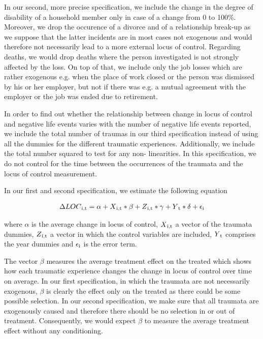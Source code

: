 \documentclass[12pt, a4paper, fleqn, parskip]{scrartcl}
\begin{document}
In our second, more precise specification, we include the change in the degree
of disability of a household member only in case of a change from 0 to 100\%.
Moreover, we drop the occurence of a divorce and of a relationship break-up as
we suppose that the latter incidents are in most cases not exogenous and would
therefore not necessarily lead to a more external locus of control. Regarding
deaths, we would drop deaths where the person investigated is not strongly
affected by the loss. On top of that, we include only the job losses which are
rather exogenous e.g. when the place of work closed or the person was dismissed
by his or her employer, but not if there was e.g. a mutual agreement with the
employer or the job was ended due to retirement.

In order to find out whether the relationship between change in locus of
control and negative life events varies with the number of negative life events
reported, we include the total number of traumas in our third specification
instead of using all the dummies for the different traumatic experiences.
Additionally, we include the total number squared to test for any non-
linearities. In this specification, we do not control for the time between the
occurrences of the traumata and the locus of control measurement.

In our first and second specification, we estimate the following equation

\begin{align}
	\Delta LOC \textsubscript{i,t}= \alpha + X \textsubscript{i,t} * \beta + Z
	\textsubscript{i,t} * \gamma + Y\textsubscript{t} * \delta +
	\epsilon\textsubscript{i}
\end{align}

where $\alpha$ is the average change in locus of control, $
X\textsubscript{i,t}$ a vector of the traumata dummies, $ Z\textsubscript{i,t}$
a vector in which the control variables are included, $ Y\textsubscript{t}$
comprises the year dummies and $\epsilon\textsubscript{i}$ is the error term.

The vector $\beta$ measures the average treatment effect on the treated which
shows how each traumatic experience changes the change in locus of control over
time on average. In our first specification, in which the traumata are not
necessarily exogenous, $\beta $ is clearly the effect only on the treated as
there could be some possible selection. In our second specification, we make
sure that all traumata are exogenously caused and therefore there should be no
selection in or out of treatment. Consequently, we would expect $\beta$ to
measure the average treatment effect without any conditioning.
\end{document}
